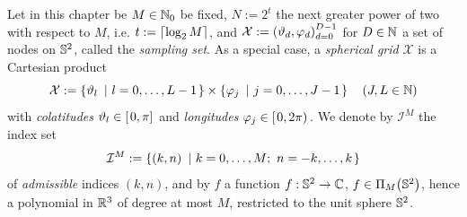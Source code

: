 Let in this chapter be $M \in \mathbb{N}_{0}$ be fixed, $N := 2^t$ the 
next greater power of two with respect to $M$, i.e. $t := {\left\lceil\log_2 M\right\rceil}$, and $\mathcal{X} := \left(\vartheta_d,\varphi_d\right)_{d=0}^{D-1}$ for $D \in \mathbb{N}$
a set of nodes on $\mathbb{S}^2$, called the \emph{sampling set}. As a special case, a \emph{spherical grid} 
$\mathcal{X}$ is a Cartesian product 
\[
  \mathcal{X} := \left\{\vartheta_{l}\ \left|\ l=0,\ldots,L-1\right.\right\rbrace \times \left\{\varphi_{j}\ \left|\ j=0,\ldots,J-1\right.\right\rbrace \quad \left(J,L \in \mathbb{N}\right)
\]
with \emph{colatitudes} $\vartheta_{l} \in \left[\left.0,\pi\right]\right.$ and \emph{longitudes} $\varphi_{j} \in \left[\left.0,2\pi\right)\right.$.
We denote by $\mathcal{I}^M$ the index set
\[
  \mathcal{I}^M := \left\{\left(k,n\right)\ \left|\ k=0,\ldots,M;\ n=-k,\ldots,k\right.\right\rbrace
\]
of \emph{admissible} indices $(k,n)$, and by $f$ a function $f: \mathbb{S}^2 \rightarrow \mathbb{C}$, $f \in \Pi_{M}{\hspace{-0.4ex}}\left(\mathbb{S}^2\right)$, hence a polynomial in $\mathbb{R}^3$ of degree at most $M$, restricted to the unit sphere $\mathbb{S}^2$.

